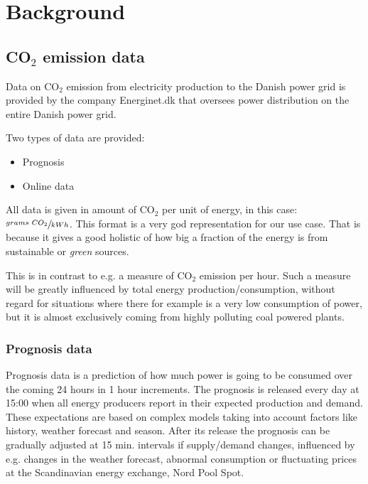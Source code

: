 \documentclass[Main]{subfiles}
\begin{document}
\section{Background} %
\label{sec:background}

	\subsection{CO$_2$ emission data} %
	\label{sub:c02_emission_data}

		Data on CO$_2$ emission from electricity production to the Danish power grid is provided by the company Energinet.dk that oversees power distribution on the entire Danish power grid.

		Two types of data are provided:
		\begin{itemize}
			\item Prognosis \cite{EnerginetFTPPrognosis:Online}
			\item Online data \cite{EnerginetFTPOnline:Online}
		\end{itemize}

		All data is given in amount of CO$_2$ per unit of energy, in this case: 
		$\sfrac{grams\ CO_2}{kWh}$.
		This format is a very god representation for our use case.
		That is because it gives a good holistic of how big a fraction of the energy is from sustainable or \emph{green} sources.
		
		This is in contrast to e.g. a measure of CO$_2$ emission per hour.
		Such a measure will be greatly influenced by total energy production/consumption, without regard for situations where there for example is a very low consumption of power, but it is almost exclusively coming from highly polluting coal powered plants.

		\subsubsection{Prognosis data} %
		\label{sub:prognosis}
			Prognosis data is a prediction of how much power is going to be consumed over the coming 24 hours in 1 hour increments.
			The prognosis is released every day at 15:00 when all energy producers report in their expected production and demand.
			These expectations are based on complex models taking into account factors like history, weather forecast and season.
			After its release the prognosis can be gradually adjusted at 15 min. intervals if supply/demand changes, influenced by e.g. changes in the weather forecast, abnormal consumption or fluctuating prices at the Scandinavian energy exchange, Nord Pool Spot.
\end{document}
